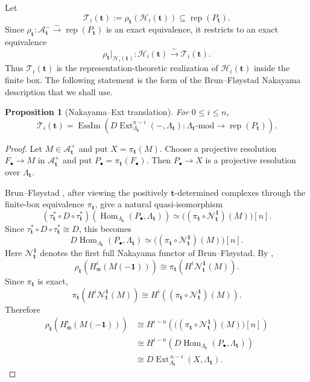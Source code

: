 \documentclass[12pt,reqno]{amsart}
\newtheorem{proposition}[theorem]{Proposition}
\theoremstyle{definition}
\theoremstyle{remark}
\newcommand{\Rep}{\operatorname{rep}}
\newcommand{\Hom}{\operatorname{Hom}}
\newcommand{\Ext}{\operatorname{Ext}}
\newcommand{\EssIm}{\operatorname{EssIm}}
\begin{document}
Let
\[
\mathcal T_i(\mathbf t):=\rho_{\mathbf t}(\mathcal H_i(\mathbf t))
\subseteq\Rep(P_{\mathbf t}).
\]
Since $\rho_{\mathbf t}:\mathcal A^-_{\mathbf t}\xrightarrow{\sim}\Rep(P_{\mathbf t})$
is an exact equivalence, it restricts to an exact equivalence
\[
\rho_{\mathbf t}|_{\mathcal H_i(\mathbf t)}:
\mathcal H_i(\mathbf t)\xrightarrow{\sim}\mathcal T_i(\mathbf t).
\]
Thus $\mathcal T_i(\mathbf t)$ is the representation-theoretic realization of
$\mathcal H_i(\mathbf t)$ inside the finite box.  The following statement is
the form of the Brun--Fl\o ystad Nakayama description that we shall use.

\begin{proposition}[Nakayama--Ext translation]\label{prop:naka-ext}
For $0\le i\le n$,
\[
\mathcal T_i(\mathbf t)
=
\EssIm\left(
D\Ext^{n-i}_{\Lambda_{\mathbf t}}(-,\Lambda_{\mathbf t})
:\Lambda_{\mathbf t}\text{-mod}\longrightarrow\Rep(P_{\mathbf t})
\right).
\]
\end{proposition}

\begin{proof}
Let $M\in\mathcal A^+_{\mathbf t}$ and put $X=\pi_{\mathbf t}(M).$
Choose a projective resolution $F_\bullet\to M$ in
$\mathcal A^+_{\mathbf t}$ and put $P_\bullet=\pi_{\mathbf t}(F_\bullet).$
Then $P_\bullet\to X$ is a projective resolution over
$\Lambda_{\mathbf t}$.

Brun--Fl\o ystad \cite[Proposition~3.9]{BF}, after viewing the
positively $\mathbf t$-determined complexes through the finite-box
equivalence $\pi_{\mathbf t}$, give a natural quasi-isomorphism
\[
(\tau_{\mathbf t}^*\circ D\circ\tau_{\mathbf t}^*)\!\left(
\Hom_{\Lambda_{\mathbf t}}(P_\bullet,\Lambda_{\mathbf t})
\right)
\simeq
\bigl((\pi_{\mathbf t}\circ\mathcal N_{\mathbf t}^{\mathbf1})(M)\bigr)[n].
\]
Since $\tau_{\mathbf t}^*\circ D\circ\tau_{\mathbf t}^*\cong D$, this becomes
\[
D\Hom_{\Lambda_{\mathbf t}}
(P_\bullet,\Lambda_{\mathbf t})
\simeq
\bigl((\pi_{\mathbf t}\circ\mathcal N_{\mathbf t}^{\mathbf1})(M)\bigr)[n].
\]
Here $\mathcal N_{\mathbf t}^{\mathbf1}$ denotes the first full
Nakayama functor of Brun--Fl\o ystad.  By
\cite[Section~2.3]{BF},
\[
\rho_{\mathbf t}\!\left(
H^i_{\mathfrak m}(M(-\mathbf1))
\right)
\cong
\pi_{\mathbf t}\!\left(
H^i\mathcal N_{\mathbf t}^{\mathbf1}(M)
\right).
\]
Since $\pi_{\mathbf t}$ is exact,
\[
\pi_{\mathbf t}\!\left(
H^i\mathcal N_{\mathbf t}^{\mathbf1}(M)
\right)
\cong
H^i\!\left(
(\pi_{\mathbf t}\circ\mathcal N_{\mathbf t}^{\mathbf1})(M)
\right).
\]
Therefore
\[
\begin{aligned}
\rho_{\mathbf t}\!\left(
H^i_{\mathfrak m}(M(-\mathbf1))
\right)
&\cong
H^{i-n}\!\left(
\bigl((\pi_{\mathbf t}\circ\mathcal N_{\mathbf t}^{\mathbf1})(M)\bigr)[n]
\right)\\
&\cong
H^{i-n}\!\left(
D\Hom_{\Lambda_{\mathbf t}}
(P_\bullet,\Lambda_{\mathbf t})
\right)\\
&\cong
D\Ext_{\Lambda_{\mathbf t}}^{\,n-i}
(X,\Lambda_{\mathbf t}).
\end{aligned}
\]
\end{proof}
\end{document}

